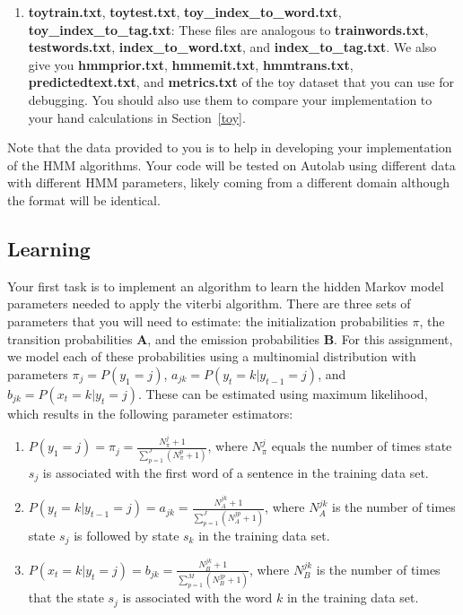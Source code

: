 \documentclass{article}
\begin{document}
\begin{enumerate}
\item \textbf{toytrain.txt}, \textbf{toytest.txt}, \textbf{toy\_index\_to\_word.txt}, \textbf{toy\_index\_to\_tag.txt}: These files are analogous to \textbf{trainwords.txt}, \textbf{testwords.txt}, \textbf{index\_to\_word.txt}, and \textbf{index\_to\_tag.txt}. We also give you \textbf{hmmprior.txt}, \textbf{hmmemit.txt}, \textbf{hmmtrans.txt}, \textbf{predictedtext.txt}, and \textbf{metrics.txt} of the toy dataset that you can use for debugging. You should also use them to compare your implementation to your hand calculations in Section~\ref{toy}.
\end{enumerate}

Note that the data provided to you is to help in developing your implementation of the HMM algorithms. Your code will be tested on Autolab using different data with different HMM parameters, likely coming from a different domain although the format will be identical.

\subsection{Learning}\label{learn}
Your first task is to implement an algorithm to learn the hidden Markov model parameters needed to apply the viterbi algorithm. There are three sets of parameters that you will need to estimate: the initialization probabilities {\boldmath$\pi$}, the transition probabilities $\mathbf A$, and the emission probabilities $\mathbf B$. For this assignment, we model each of these probabilities using a multinomial distribution with parameters $ \pi_j=P(y_1=j)$, $ a_{jk} = P(y_{t}=k\vert y_{t-1}=j)$, and $ b_{jk} = P(x_t=k\vert y_{t}=j)$. These can be estimated using maximum likelihood, which results in the following parameter estimators:

\begin{enumerate}
    \item $P(y_1 = j) = \pi_j = \frac{N_\pi^j+1}{\sum_{p=1}^{J}(N_\pi^p+1)}$, where $N_\pi^j$ equals the number of times state $s_j$ is associated with the first word of a sentence in the training data set.
    \item $P(y_{t} = k\vert y_{t-1}=j) = a_{jk}= \frac{N_A^{jk}+1}{\sum_{p=1}^J (N_A^{jp}+1)}$, where $N_A^{jk}$ is the number of times state $s_j$ is followed by state $s_k$ in the training data set.  
    \item $P(x_{t} = k\vert y_{t}=j) = b_{jk}= \frac{N_B^{jk}+1}{\sum_{p=1}^M (N_B^{jp}+1)}$, where $N_B^{jk}$ is the number of times that the state $s_j$ is associated with the word $k$ in the training data set.
\end{enumerate}
\end{document}
